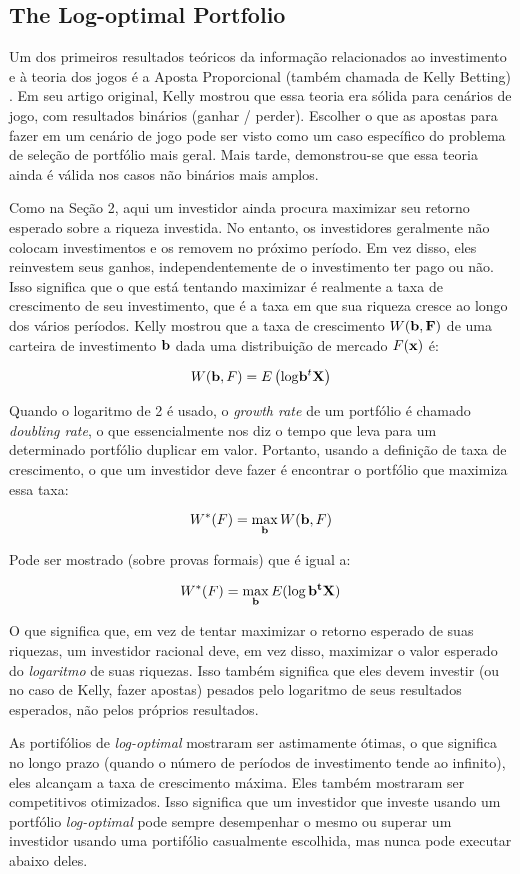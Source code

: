 \subsection{The Log-optimal Portfolio}
Um dos primeiros resultados teóricos da informação relacionados ao investimento e à teoria dos jogos é a Aposta Proporcional (também chamada de Kelly Betting) \cite{kelly1}. Em seu artigo original, Kelly mostrou que essa teoria era sólida para cenários de jogo, com resultados binários (ganhar / perder). Escolher o que as apostas para fazer em um cenário de jogo pode ser visto como um caso específico do problema de seleção de portfólio mais geral. Mais tarde, demonstrou-se que essa teoria ainda é válida nos casos não binários mais amplos.

Como na Seção 2, aqui um investidor ainda procura maximizar seu retorno esperado sobre a riqueza investida. No entanto, os investidores geralmente não colocam investimentos e os removem no próximo período. Em vez disso, eles reinvestem seus ganhos, independentemente de o investimento ter pago ou não. Isso significa que o que está tentando maximizar é realmente a taxa de crescimento de seu investimento, que é a taxa em que sua riqueza cresce ao longo dos vários períodos. Kelly mostrou que a taxa de crescimento $ W(\bf{b}, F) $ de uma carteira de investimento $ \bf{b} $ dada uma distribuição de mercado $ F(\bf{x}) $ é:

\[W({\bf{b}},F) = E\left({{{\log }}{{\bf{b}}^t}{\bf{X}}}\right)\]

Quando o logaritmo de 2 é usado, o \emph{growth rate} de um portfólio é chamado \emph{doubling rate}, o que essencialmente nos diz o tempo que leva para um determinado portfólio duplicar em valor. Portanto, usando a definição de taxa de crescimento, o que um investidor deve fazer é encontrar o portfólio que maximiza essa taxa:

\[{W^*}(F) = \mathop {\max }\limits_{\bf{b}} W({\bf{b}},F)\]

Pode ser mostrado (sobre provas formais) que é igual a:

\[{W^*}(F) = \mathop {\max }\limits_{\bf{b}} E(\log \bf{b}^t \bf{X})\]

O que significa que, em vez de tentar maximizar o retorno esperado de suas riquezas, um investidor racional deve, em vez disso, maximizar o valor esperado do \emph{logaritmo} de suas riquezas. Isso também significa que eles devem investir (ou no caso de Kelly, fazer apostas) pesados pelo logaritmo de seus resultados esperados, não pelos próprios resultados.

As portifólios de \emph{log-optimal} mostraram ser astimamente ótimas, o que significa no longo prazo (quando o número de períodos de investimento tende ao infinito), eles alcançam a taxa de crescimento máxima. Eles também mostraram ser competitivos otimizados. Isso significa que um investidor que investe usando um portfólio \emph{log-optimal} pode sempre desempenhar o mesmo ou superar um investidor usando uma portifólio casualmente escolhida, mas nunca pode executar abaixo deles.